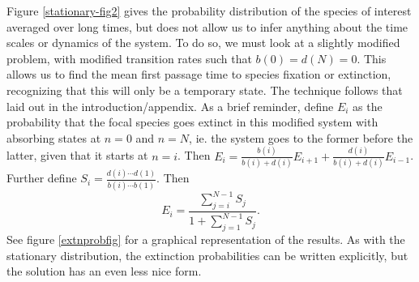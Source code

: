 Figure \ref{stationary-fig2} gives the probability distribution of the species of interest averaged over long times, but does not allow us to infer anything about the time scales or dynamics of the system. 
To do so, we must look at a slightly modified problem, with modified transition rates such that $b(0)=d(N)=0$. 
This allows us to find the mean first passage time to species fixation or extinction, recognizing that this will only be a temporary state. 
The technique follows that laid out in the introduction/appendix. 
As a brief reminder, define $E_i$ as the probability that the focal species goes extinct in this modified system with absorbing states at $n=0$ and $n=N$, ie. the system goes to the former before the latter, given that it starts at $n=i$. 
Then $E_i = \frac{b(i)}{b(i)+d(i)}E_{i+1} + \frac{d(i)}{b(i)+d(i)}E_{i-1}$. 
Further define $S_i = \frac{d(i)\cdots d(1)}{b(i)\cdots b(1)}$. 
Then 
\begin{equation} \label{extnprob}
E_{i} = \frac{\sum_{j=i}^{N-1}S_j}{1+\sum_{j=1}^{N-1}S_j}. 
\end{equation}
See figure \ref{extnprobfig} for a graphical representation of the results. 
As with the stationary distribution, the extinction probabilities can be written explicitly, but the solution has an even less nice form. 
